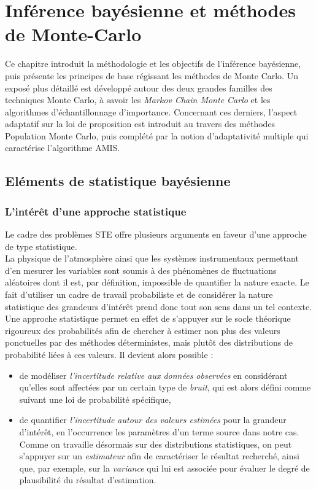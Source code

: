 \afterpage{\blankpage}

\chapter{Inférence bayésienne et méthodes de Monte-Carlo}

Ce chapitre introduit {la méthodologie} et les objectifs de l'inférence bayésienne, puis présente les principes de base régissant les méthodes de Monte Carlo. Un exposé plus détaillé est développé autour des deux grandes familles des techniques Monte Carlo, à savoir les \textit{Markov Chain Monte Carlo} et les algorithmes d'échantillonnage d'importance. Concernant ces derniers, l'aspect adaptatif sur la loi de proposition est introduit au travers des méthodes Population Monte Carlo, puis complété par la notion d'adaptativité multiple qui caractérise l'algorithme AMIS. 


\section{Eléments de statistique bayésienne}

\subsection{L'intérêt d'une approche statistique}
\label{ss_erreurs}

Le cadre des problèmes STE offre plusieurs arguments en faveur d'une approche de type statistique.\\

La physique de l'atmosphère ainsi que les systèmes instrumentaux permettant d'en mesurer les variables sont soumis à des phénomènes de fluctuations aléatoires dont il est, par définition, impossible  de quantifier la nature exacte. Le fait d'utiliser un cadre de travail probabiliste et de considérer la nature statistique des grandeurs d'intérêt prend donc tout son sens dans un tel contexte. Une approche statistique permet en effet de s'appuyer sur le socle théorique rigoureux des probabilités afin de chercher à estimer non plus des valeurs ponctuelles par des méthodes déterministes, mais plutôt des distributions de probabilité liées à ces valeurs. Il devient alors possible : 

\begin{itemize}
	\item de modéliser \textit{l'incertitude relative aux données observées} en considérant qu'elles sont affectées par un certain type de \textit{bruit}, qui est alors défini comme suivant une loi de probabilité spécifique,
	\item de quantifier \textit{l'incertitude autour des valeurs estimées} pour la grandeur d'intérêt, en l'occurrence les paramètres d'un terme source dans notre cas. Comme on travaille désormais sur des distributions statistiques, on peut s'appuyer sur un \textit{estimateur} afin de caractériser le résultat recherché, ainsi que, {par exemple}, sur la \textit{variance} qui lui est associée pour évaluer le degré de plausibilité du résultat d'estimation.
\end{itemize}

